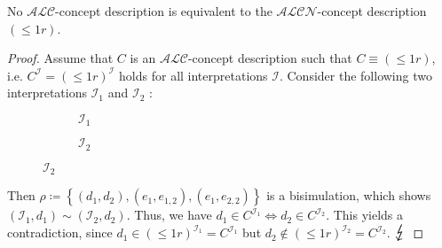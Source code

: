 \begin{prop}
	No $\mathcal{ALC}$-concept description is equivalent to the $\mathcal{ALCN}$-concept description $\left( \leq 1 r \right)$.
\end{prop}
\begin{proof}
	Assume that $C$ is an $\mathcal{ALC}$-concept description such that $C \equiv ( \leq 1 r )$, i.e. $C^{\mathcal{I}} = \left( \leq 1 r \right)^\mathcal{I}$ holds for all interpretations $\mathcal{I}$.
	Consider the following two interpretations $\mathcal{I}_1$ and $\mathcal{I}_2$ :
	\begin{figure}[H]
		\centering
		\begin{subfigure}[t]{.475\textwidth}
			\centering
			\caption{$\mathcal{I}_1$}
		\end{subfigure}
		\hfill
		\begin{subfigure}[t]{.475\textwidth}
			\centering
			\caption{$\mathcal{I}_2$}
		\end{subfigure}
	\end{figure}
	Then $\rho \coloneqq \left\{ (d_1,d_2), (e_1,e_{1,2}), (e_1,e_{2,2}) \right\}$ is a bisimulation, which shows $(\mathcal{I}_1, d_1) \sim (\mathcal{I}_2,d_2)$.
	Thus, we have $d_1 \in C^{\mathcal{I}_1} \iff d_2 \in C^{\mathcal{I}_2}$.
	This yields a contradiction, since $d_1 \in ( \leq 1r)^{\mathcal{I}_1} = C^{\mathcal{I}_1}$ but $d_2 \notin ( \leq 1r)^{\mathcal{I}_2} = C^{\mathcal{I}_2}$. $\contra$
\end{proof}

